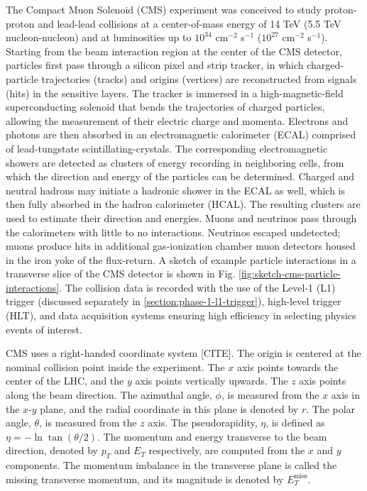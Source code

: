 The Compact Muon Solenoid (CMS) experiment was conceived to study proton-proton and lead-lead collisions at a center-of-mass energy of 14 TeV (5.5 TeV nucleon-nucleon) and at luminosities up to $10^{34}$ cm$^{-2}$ s$^{-1}$ ($10^{27}$ cm$^{-2}$ s$^{-1}$). Starting from the beam interaction region at the center of the CMS detector, particles first pass through a silicon pixel and strip tracker, in which charged-particle trajectories (tracks) and origins (vertices) are reconstructed from signals (hits) in the sensitive layers. The tracker is immersed in a high-magnetic-field superconducting solenoid that bends the trajectories of charged particles, allowing the measurement of their electric charge and momenta. Electrons and photons are then absorbed in an electromagnetic calorimeter (ECAL) comprised of lead-tungstate scintillating-crystals. The corresponding electromagnetic showers are detected as clusters of energy recording in neighboring cells, from which the direction and energy of the particles can be determined. Charged and neutral hadrons may initiate a hadronic shower in the ECAL as well, which is then fully absorbed in the hadron calorimeter (HCAL). The resulting clusters are used to estimate their direction and energies. Muons and neutrinos pass through the calorimeters with little to no interactions. Neutrinos escaped undetected; muons produce hits in additional gas-ionization chamber muon detectors housed in the iron yoke of the flux-return. A sketch of example particle interactions in a transverse slice of the CMS detector is shown in Fig. \ref{fig:sketch-cms-particle-interactions}. The collision data is recorded with the use of the Level-1 (L1) trigger (discussed separately in \ref{section:phase-1-l1-trigger}), high-level trigger (HLT), and data acquisition systems ensuring high efficiency in selecting physics events of interest. 


CMS uses a right-handed coordinate system [CITE]. The origin is centered at the nominal collision point inside the experiment. The $x$ axis points towards the center of the LHC, and the $y$ axis points vertically upwards. The $z$ axis points along the beam direction. The azimuthal angle, $\phi$, is measured from the $x$ axis in the $x$-$y$ plane, and the radial coordinate in this plane is denoted by $r$. The polar angle, $\theta$, is measured from the $z$ axis. The pseudorapidity, $\eta$, is defined as $\eta = -\ln \tan(\theta/2)$. The momentum and energy transverse to the beam direction, denoted by $p_{T}$ and $E_{T}$ respectively, are computed from the $x$ and $y$ components. The momentum imbalance in the transverse plane is called the missing transverse momentum, and its magnitude is denoted by $E_{T}^{\text{miss}}$.

